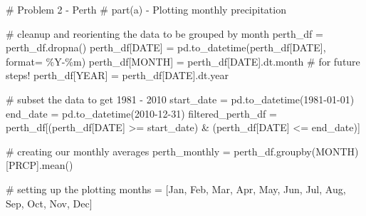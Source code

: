 \documentclass[
  letterpaper,
  DIV=11,
  numbers=noendperiod]{scrartcl}
\newenvironment{Shaded}{\begin{snugshade}}{\end{snugshade}}
\newcommand{\BuiltInTok}[1]{\textcolor[rgb]{0.00,0.23,0.31}{#1}}
\newcommand{\CommentTok}[1]{\textcolor[rgb]{0.37,0.37,0.37}{#1}}
\newcommand{\NormalTok}[1]{\textcolor[rgb]{0.00,0.23,0.31}{#1}}
\newcommand{\OperatorTok}[1]{\textcolor[rgb]{0.37,0.37,0.37}{#1}}
\newcommand{\StringTok}[1]{\textcolor[rgb]{0.13,0.47,0.30}{#1}}
\begin{document}
\begin{Shaded}
\begin{Highlighting}[]
\CommentTok{\# Problem 2 {-} Perth}
\CommentTok{\# part(a) {-} Plotting monthly precipitation}

\CommentTok{\# cleanup and reorienting the data to be grouped by month}
\NormalTok{perth\_df }\OperatorTok{=}\NormalTok{ perth\_df.dropna()}
\NormalTok{perth\_df[}\StringTok{\textquotesingle{}DATE\textquotesingle{}}\NormalTok{] }\OperatorTok{=}\NormalTok{ pd.to\_datetime(perth\_df[}\StringTok{\textquotesingle{}DATE\textquotesingle{}}\NormalTok{], }\BuiltInTok{format}\OperatorTok{=} \StringTok{\textquotesingle{}\%Y{-}\%m\textquotesingle{}}\NormalTok{)}
\NormalTok{perth\_df[}\StringTok{\textquotesingle{}MONTH\textquotesingle{}}\NormalTok{] }\OperatorTok{=}\NormalTok{ perth\_df[}\StringTok{\textquotesingle{}DATE\textquotesingle{}}\NormalTok{].dt.month}
\CommentTok{\# for future steps!}
\NormalTok{perth\_df[}\StringTok{\textquotesingle{}YEAR\textquotesingle{}}\NormalTok{] }\OperatorTok{=}\NormalTok{ perth\_df[}\StringTok{\textquotesingle{}DATE\textquotesingle{}}\NormalTok{].dt.year}

\CommentTok{\# subset the data to get 1981 {-} 2010}
\NormalTok{start\_date }\OperatorTok{=}\NormalTok{ pd.to\_datetime(}\StringTok{\textquotesingle{}1981{-}01{-}01\textquotesingle{}}\NormalTok{)}
\NormalTok{end\_date }\OperatorTok{=}\NormalTok{ pd.to\_datetime(}\StringTok{\textquotesingle{}2010{-}12{-}31\textquotesingle{}}\NormalTok{)}
\NormalTok{filtered\_perth\_df }\OperatorTok{=}\NormalTok{ perth\_df[(perth\_df[}\StringTok{\textquotesingle{}DATE\textquotesingle{}}\NormalTok{] }\OperatorTok{\textgreater{}=}\NormalTok{ start\_date) }\OperatorTok{\&}\NormalTok{ (perth\_df[}\StringTok{\textquotesingle{}DATE\textquotesingle{}}\NormalTok{] }\OperatorTok{\textless{}=}\NormalTok{ end\_date)]}

\CommentTok{\# creating our monthly averages}
\NormalTok{perth\_monthly }\OperatorTok{=}\NormalTok{ perth\_df.groupby(}\StringTok{\textquotesingle{}MONTH\textquotesingle{}}\NormalTok{)[}\StringTok{\textquotesingle{}PRCP\textquotesingle{}}\NormalTok{].mean()}


\CommentTok{\# setting up the plotting}
\NormalTok{months }\OperatorTok{=}\NormalTok{ [}\StringTok{\textquotesingle{}Jan\textquotesingle{}}\NormalTok{, }\StringTok{\textquotesingle{}Feb\textquotesingle{}}\NormalTok{, }\StringTok{\textquotesingle{}Mar\textquotesingle{}}\NormalTok{, }\StringTok{\textquotesingle{}Apr\textquotesingle{}}\NormalTok{, }\StringTok{\textquotesingle{}May\textquotesingle{}}\NormalTok{, }\StringTok{\textquotesingle{}Jun\textquotesingle{}}\NormalTok{, }\StringTok{\textquotesingle{}Jul\textquotesingle{}}\NormalTok{, }\StringTok{\textquotesingle{}Aug\textquotesingle{}}\NormalTok{, }\StringTok{\textquotesingle{}Sep\textquotesingle{}}\NormalTok{, }\StringTok{\textquotesingle{}Oct\textquotesingle{}}\NormalTok{, }\StringTok{\textquotesingle{}Nov\textquotesingle{}}\NormalTok{, }\StringTok{\textquotesingle{}Dec\textquotesingle{}}\NormalTok{]}


\end{Highlighting}
\end{Shaded}
\end{document}
